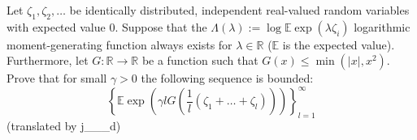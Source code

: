 Let $\zeta_1, \zeta_2,\ldots$ be identically distributed, independent real-valued random variables with expected value $0$. Suppose that the $\Lambda (\lambda) := \log \mathbb E \exp (\lambda \zeta_i)$ logarithmic moment-generating function always exists for $\lambda\in\mathbb R$ ($\mathbb E$ is the expected value). Furthermore, let $G\colon\mathbb R \rightarrow \mathbb R$ be a function such that $G(x)\leq \min (|x|, x^2)$. Prove that for small $\gamma >0$ the following sequence is bounded:
$$\left\{ \mathbb E \exp \left( \gamma l G \left( \frac 1l (\zeta_1+\ldots + \zeta_l)\right)\right)\right\}^{\infty}_{l=1}$$
(translated by j___d)